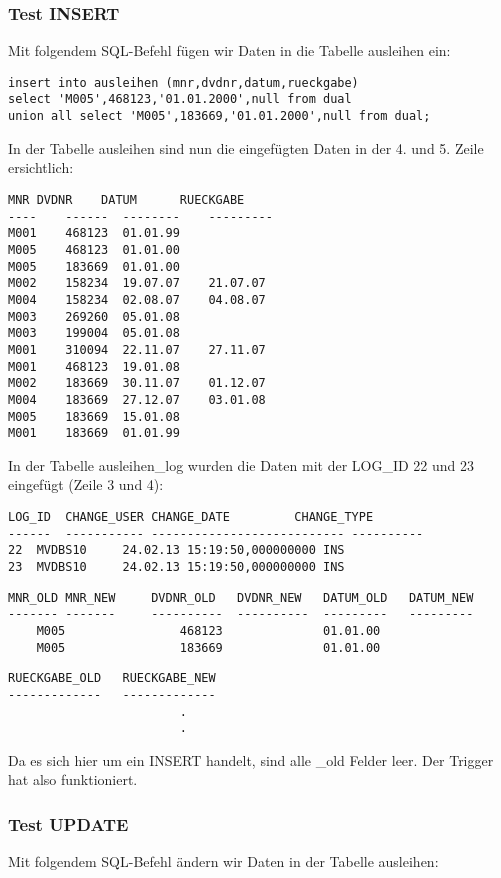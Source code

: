 \documentclass[11pt,a4paper,parskip=half]{scrartcl}
\begin{document}
\subsubsection{Test INSERT}
Mit folgendem SQL-Befehl fügen wir Daten in die Tabelle ausleihen ein:

\begin{lstlisting}
insert into ausleihen (mnr,dvdnr,datum,rueckgabe) 
select 'M005',468123,'01.01.2000',null from dual
union all select 'M005',183669,'01.01.2000',null from dual;
\end{lstlisting}

In der Tabelle ausleihen sind nun die eingefügten Daten in der 4. und 5. Zeile ersichtlich:

\begin{lstlisting}
MNR	DVDNR	 DATUM		RUECKGABE
---- 	------	-------- 	---------
M001	468123 	01.01.99	
M005	468123	01.01.00	
M005	183669	01.01.00	
M002	158234 	19.07.07	21.07.07  
M004	158234 	02.08.07	04.08.07  
M003	269260 	05.01.08	
M003	199004 	05.01.08	
M001	310094 	22.11.07	27.11.07  
M001	468123 	19.01.08	
M002	183669 	30.11.07	01.12.07  
M004	183669 	27.12.07	03.01.08  
M005	183669 	15.01.08	
M001	183669	01.01.99	
\end{lstlisting}

In der Tabelle ausleihen\_log wurden die Daten mit der LOG\_ID 22 und 23 eingefügt (Zeile 3 und 4):

\begin{lstlisting}
LOG_ID	CHANGE_USER	CHANGE_DATE			CHANGE_TYPE	
------	-----------	---------------------------	----------		
22	MVDBS10		24.02.13 15:19:50,000000000	INS					
23	MVDBS10		24.02.13 15:19:50,000000000	INS					
\end{lstlisting}

\begin{lstlisting}
MNR_OLD	MNR_NEW		DVDNR_OLD	DVDNR_NEW	DATUM_OLD	DATUM_NEW	
-------	-------		----------	----------	---------	--------- 	
	M005				468123				01.01.00					
	M005				183669				01.01.00					
\end{lstlisting}
\begin{lstlisting}
RUECKGABE_OLD	RUECKGABE_NEW
-------------	-------------	
						.
						.
\end{lstlisting}

Da es sich hier um ein INSERT handelt, sind alle \_old Felder leer. Der Trigger hat also funktioniert.

\subsubsection{Test UPDATE}
Mit folgendem SQL-Befehl ändern wir Daten in der Tabelle ausleihen:
\end{document}
